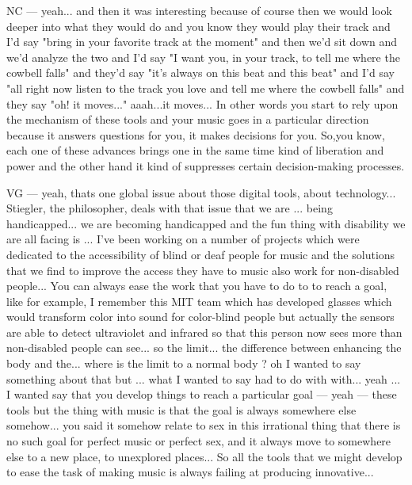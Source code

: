NC — yeah... and then it was interesting because of course then we would look deeper into what they would do and you know they would play their track and I'd say "bring in your favorite track at the moment" and then we'd sit down and we'd analyze the two and I'd say "I want you, in your track, to tell me where the cowbell falls" and they'd say "it's always on this beat and  this beat" and I'd say "all right now listen to the track you love and tell me where the cowbell falls" and they say "oh! it moves..." aaah...it moves...  In other words you start to rely upon the mechanism of these tools and your music goes in a particular direction because it answers questions for you, it makes decisions for you. So,you know, each one of these advances brings one in the same time kind of liberation and power and the other hand it kind of suppresses certain decision-making processes. 

VG — yeah, thats one global issue about those digital tools, about technology... Stiegler, the philosopher, deals with that issue that we are ... being handicapped... we are becoming handicapped and the fun thing with disability we are all facing is ... I've been working on a number of projects which were dedicated to the accessibility of blind or deaf people  for music and the solutions that we find to improve the access they have to music also work for non-disabled people... You can always ease the work that you have to do to to reach a goal, like for example, I remember this MIT team which has developed glasses which would transform color into sound for color-blind people but actually the sensors are able to detect ultraviolet and infrared so that this person now sees more than non-disabled people can see... so the limit... the difference between enhancing the body and the... where is the limit to a normal body ? oh I wanted to say something about that but ... what I wanted to say had to do with with... yeah ... I wanted say that you develop things to reach a particular goal — yeah — these tools but the thing with music is that the goal is always somewhere else somehow... you said it somehow relate to sex in this irrational thing that there is no such goal for perfect music or perfect sex,  and it always move to somewhere else to a new place, to unexplored places... So all the tools that we might develop to ease the task of making music is always failing at producing innovative... 

